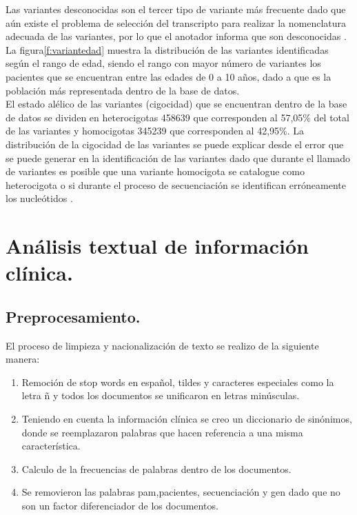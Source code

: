 Las variantes desconocidas son el tercer tipo de variante más frecuente dado que aún existe el problema de selección del transcripto para realizar la nomenclatura adecuada de las variantes, por lo que el anotador informa que son desconocidas \cite{McCarthy2014}. La figura\ref{f:variantedad} muestra la distribución de las variantes identificadas según el rango de edad, siendo el rango con mayor número de variantes los pacientes que se encuentran entre las edades de 0 a 10 años, dado a que es la población más representada dentro de la base de datos. \\

El estado alélico de las variantes (cigocidad) que se encuentran dentro de la base de datos se dividen en heterocigotas 458639 que corresponden al 57,05\% del total de las variantes  y homocigotas 345239 que corresponden al 42,95\%. La distribución de la cigocidad de las variantes se puede explicar desde el error que se puede generar en la identificación de las variantes dado que durante el llamado  de variantes es posible que una variante homocigota se catalogue como heterocigota o si durante el proceso de secuenciación se identifican erróneamente los nucleótidos \cite{Babraham2016}\cite{Pirooznia2014}. 


\section{Análisis textual de información clínica.}

 
\subsection{Preprocesamiento.}

El proceso de limpieza y nacionalización de texto se realizo de la siguiente manera:

 \begin{enumerate}
 	\item Remoción de stop words en español, tildes y caracteres especiales como  la letra ñ y todos los documentos se unificaron en letras minúsculas.
 	\item Teniendo en cuenta la información clínica se creo un diccionario de sinónimos, donde se reemplazaron palabras que hacen referencia a una misma característica.
 	\item Calculo de la frecuencias de palabras dentro de los documentos. 
 	\item Se removieron las palabras pam,pacientes, secuenciación y gen dado que no son un factor diferenciador de los documentos.  	  
 \end{enumerate}

